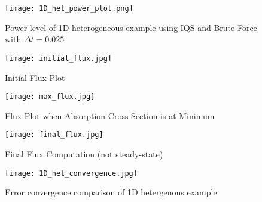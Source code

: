 \documentclass[10pt]{scrartcl}
\begin{document}
\begin{figure}[!htbp]
\texttt{[image: 1D\_het\_power\_plot.png]}
\caption{Power level of 1D heterogeneous example using IQS and Brute Force with $\Delta t = 0.025$}
\label{fig:power}
\end{figure}

\begin{figure}[!htbp]
\begin{center}
\texttt{[image: initial\_flux.jpg]}
\caption{Initial Flux Plot}
\label{fig:initial}
\end{center}
\end{figure}

\begin{figure}[!htbp]
\begin{center}
\texttt{[image: max\_flux.jpg]}
\caption{Flux Plot when Absorption Cross Section is at Minimum}
\label{fig:max}
\end{center}
\end{figure}

\begin{figure}[!htbp]
\begin{center}
\texttt{[image: final\_flux.jpg]}
\caption{Final Flux Computation (not steady-state)}
\label{fig:final}
\end{center}
\end{figure}

\begin{figure}[!htbp]
\centering
\texttt{[image: 1D\_het\_convergence.jpg]}
\caption{Error convergence comparison of 1D hetergenous example}
\label{fig:conv}
\end{figure}
\end{document}
